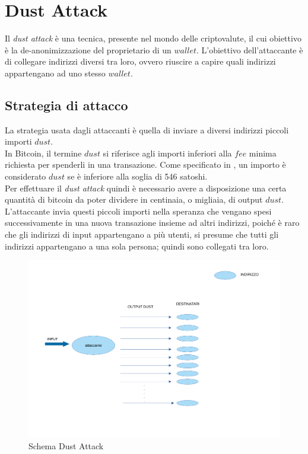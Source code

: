 \chapter{Dust Attack}
Il \textit{dust attack} è una tecnica, presente nel mondo delle criptovalute, il cui obiettivo è la 
de-anonimizzazione del proprietario di un $wallet$. L'obiettivo dell'attaccante è di collegare indirizzi diversi tra loro, ovvero riuscire a capire quali indirizzi appartengano ad uno stesso $wallet$.\\

\section{Strategia di attacco}
La strategia usata dagli attaccanti è quella di inviare a diversi indirizzi piccoli importi $dust$.\\
In Bitcoin, il termine $dust$ si riferisce agli importi inferiori alla $fee$ minima richiesta per spenderli in una transazione. Come specificato in \cite{BtcDev}, un
importo è considerato $dust$ se è inferiore alla soglia di 546 satoshi.\\
Per effettuare il \textit{dust attack} quindi è necessario avere a disposizione una certa quantità di bitcoin da poter dividere in centinaia, o migliaia, di output $dust$.
L'attaccante invia questi piccoli importi nella speranza che vengano spesi successivamente in una nuova transazione insieme ad altri indirizzi, poiché è raro che gli indirizzi di input appartengano a più utenti, si presume che tutti gli indirizzi appartengano a una sola persona; quindi sono collegati tra loro.
\begin{figure}[h!]
    \centering
    \includegraphics[scale=0.5]{Images/dust_attack.pdf}
    \caption{Schema Dust Attack}
    \label{fig:Dust_attack}
\end{figure}
